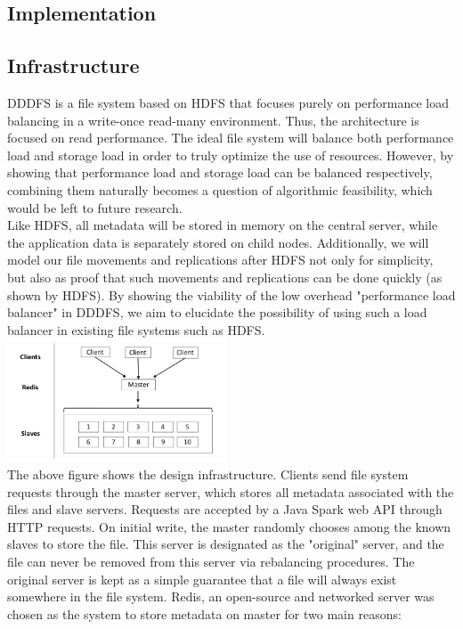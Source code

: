 \documentclass[twoside]{article}
\begin{document}
\begin{multicols}{2}

\section{Implementation}
\subsection*{Infrastructure}
DDDFS is a file system based on HDFS that focuses purely on performance load balancing in a write-once read-many environment. Thus, the architecture is focused on read performance. The ideal file system will balance both performance load and storage load in order to truly optimize the use of resources. However, by showing that performance load and storage load can be balanced respectively, combining them naturally becomes a question of algorithmic feasibility, which would be left to future research.\\\indent
Like HDFS, all metadata will be stored in memory on the central server, while the application data is separately stored on child nodes. Additionally, we will model our file movements and replications after HDFS not only for simplicity, but also as proof that such movements and replications can be done quickly (as shown by HDFS). By showing the viability of the low overhead "performance load balancer" in DDDFS, we aim to elucidate the possibility of using such a load balancer in existing file systems such as HDFS.
\includegraphics[width=6.5cm]{res/server_diagram.jpg}\\\indent
The above figure shows the design infrastructure. Clients send file system requests through the master server, which stores all metadata associated with the files and slave servers. Requests are accepted by a Java Spark web API through HTTP requests. On initial write, the master randomly chooses among the known slaves to store the file. This server is designated as the "original" server, and the file can never be removed from this server via rebalancing procedures. The original server is kept as a simple guarantee that a file will always exist somewhere in the file system. Redis, an open-source and networked server was chosen as the system to store metadata on master for two main reasons:

\end{multicols}
\end{document}
